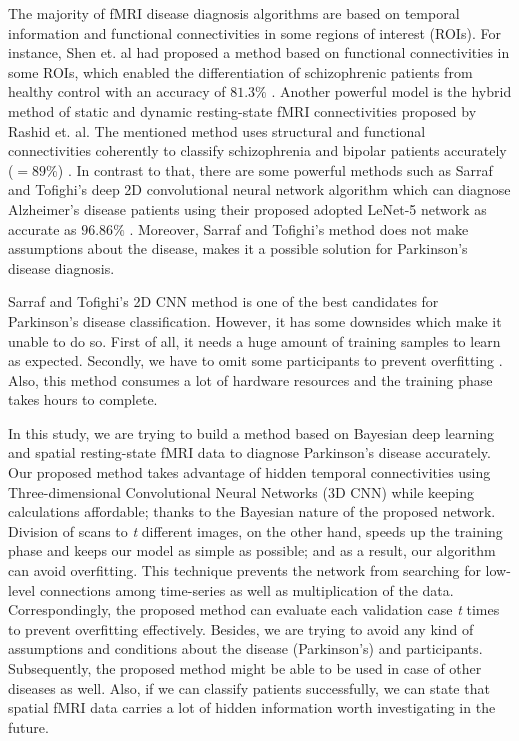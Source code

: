 \documentclass[preprint,12pt]{elsarticle}
\begin{document}
The majority of fMRI disease diagnosis algorithms are based on temporal information and functional connectivities in some regions of interest (ROIs)\cite{Adali2014}. For instance, Shen et. al had proposed a method based on functional connectivities in some ROIs, which enabled the differentiation of schizophrenic patients from healthy control with an accuracy of $81.3\%$ \cite{Shen2014}. Another powerful model is the hybrid method of static and dynamic resting-state fMRI connectivities proposed by Rashid et. al. The mentioned method uses structural and functional connectivities coherently to classify schizophrenia and bipolar patients accurately ($=89\%$) \cite{Rashid2016}. In contrast to that, there are some powerful methods such as Sarraf and Tofighi's deep 2D convolutional neural network algorithm which can diagnose Alzheimer's disease patients using their proposed adopted LeNet-5 network as accurate as $96.86\%$ \cite{Sarraf2016}. Moreover, Sarraf and Tofighi's method does not make assumptions about the disease, makes it a possible solution for Parkinson's disease diagnosis.

Sarraf and Tofighi's 2D CNN method is one of the best candidates for Parkinson's disease classification. However, it has some downsides which make it unable to do so. First of all, it needs a huge amount of training samples to learn as expected. Secondly, we have to omit some participants to prevent overfitting \cite{Sarraf2016}. Also, this method consumes a lot of hardware resources and the training phase takes hours to complete.

In this study, we are trying to build a method based on Bayesian deep learning and spatial resting-state fMRI data to diagnose Parkinson's disease accurately. Our proposed method takes advantage of hidden temporal connectivities using Three-dimensional Convolutional Neural Networks (3D CNN) while keeping calculations affordable; thanks to the Bayesian nature of the proposed network. Division of scans to {\it t} different images, on the other hand, speeds up the training phase and keeps our model as simple as possible; and as a result, our algorithm can avoid overfitting. This technique prevents the network from searching for low-level connections among time-series as well as multiplication of the data. Correspondingly, the proposed method can evaluate each validation case {\it t} times to prevent overfitting effectively. Besides, we are trying to avoid any kind of assumptions and conditions about the disease (Parkinson's) and participants. Subsequently, the proposed method might be able to be used in case of other diseases as well. Also, if we can classify patients successfully, we can state that spatial fMRI data carries a lot of hidden information worth investigating in the future.
\end{document}
